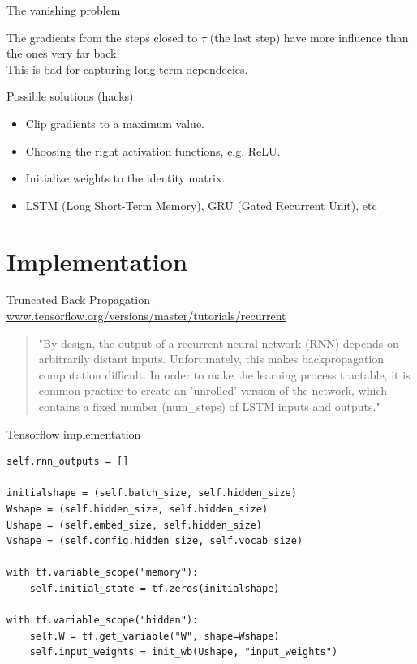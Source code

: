 \documentclass[10pt]{beamer}
\begin{document}
\begin{frame}{The vanishing problem}

The gradients from the steps closed to $\tau$ (the last step) have more influence than the ones very far back.\\

This is bad for capturing \alert{long-term dependecies}.
\end{frame}

\begin{frame}{Possible solutions (hacks)}
\begin{itemize}
\item Clip gradients to a maximum value.
\vspace{0.4cm}
\item Choosing the right activation functions, e.g. ReLU.
\vspace{0.4cm}
\item Initialize weights to the identity matrix.
\vspace{0.4cm}
\item LSTM (Long Short-Term Memory), GRU (Gated Recurrent Unit), etc
\end{itemize}
\end{frame}


\section{Implementation}

\begin{frame}{Truncated Back Propagation}
\url{www.tensorflow.org/versions/master/tutorials/recurrent}
\begin{quote}
"By design, the output of a recurrent neural network (RNN) depends on arbitrarily distant inputs. Unfortunately, this makes backpropagation computation difficult. In order to make the learning process tractable, \alert{it is common practice to create an 'unrolled' version of the network, which contains a fixed number (num\_steps) of LSTM inputs and outputs}."
\end{quote}
\end{frame}

\begin{frame}[fragile]{Tensorflow implementation}
\begin{verbatim}
self.rnn_outputs = []

initialshape = (self.batch_size, self.hidden_size)
Wshape = (self.hidden_size, self.hidden_size)
Ushape = (self.embed_size, self.hidden_size)
Vshape = (self.config.hidden_size, self.vocab_size)

with tf.variable_scope("memory"):
    self.initial_state = tf.zeros(initialshape)

with tf.variable_scope("hidden"):
    self.W = tf.get_variable("W", shape=Wshape)
    self.input_weights = init_wb(Ushape, "input_weights")
\end{verbatim}
\end{frame}
\end{document}
